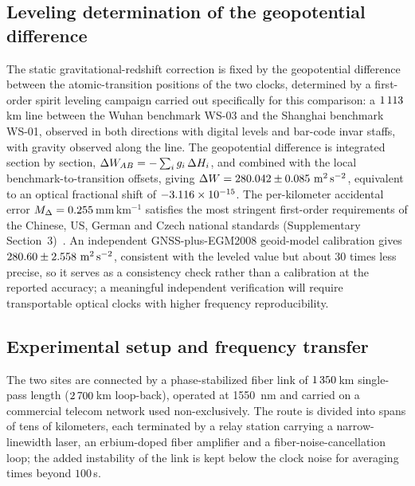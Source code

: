 \subsection*{Leveling determination of the geopotential difference}

The static gravitational-redshift correction is fixed by the
geopotential difference between the atomic-transition positions of the
two clocks, determined by a first-order spirit leveling campaign
carried out specifically for this comparison: a
$1\thinspace113$\,km line between the Wuhan benchmark WS-03 and the
Shanghai benchmark WS-01, observed in both directions with digital
levels and bar-code invar staffs, with gravity observed along the
line. The geopotential difference is integrated section by section,
$\Delta W_{AB} = -\sum_i g_i\,\Delta H_i$, and combined with the local
benchmark-to-transition offsets, giving
$\Delta W = 280.042 \pm 0.085~\mathrm{m^2\,s^{-2}}$, equivalent to an
optical fractional shift of $-3.116\times10^{-15}$. The per-kilometer accidental
error $M_\Delta = 0.255$\,mm\,km$^{-1}$ satisfies the most
stringent first-order requirements of the Chinese, US, German and
Czech national standards (Supplementary
Section~3)~\citep{fgcc1984,gb12897,cuzk2015,advfapn2022}. An
independent GNSS-plus-EGM2008 geoid-model calibration gives
$280.60 \pm 2.558~\mathrm{m^2\,s^{-2}}$, consistent with the
leveled value but about 30 times less precise, so it serves as a
consistency check rather than a calibration at the reported
accuracy; a meaningful independent verification will require
transportable optical clocks with higher frequency reproducibility.

\subsection*{Experimental setup and frequency transfer}

The two sites are connected by a phase-stabilized fiber link of
$1\thinspace350$\,km single-pass length ($2\thinspace700$\,km loop-back),
operated at \qty{1550}{nm} and carried on a commercial telecom
network used non-exclusively. The route is divided into spans of tens
of kilometers, each terminated by a relay station carrying a
narrow-linewidth laser, an erbium-doped fiber amplifier and a
fiber-noise-cancellation loop; the added instability of the link is
kept below the clock noise for averaging times beyond $100$\,s.

